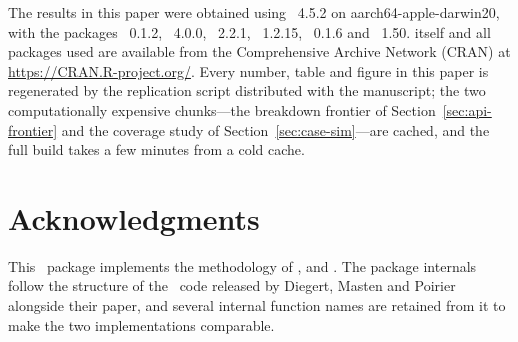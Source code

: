 \documentclass[article]{jss}\usepackage[]{graphicx}\usepackage[]{xcolor}
\newcommand{\Rlang}{\proglang{R}}
\newcommand{\Stata}{\proglang{Stata}}
\begin{document}
The results in this paper were obtained using
~4.5.2
on aarch64-apple-darwin20, with the packages
~0.1.2,
~4.0.0,
~2.2.1,
~1.2.15,
~0.1.6 and
~1.50.
 itself and all packages used are available from the
Comprehensive  Archive Network (CRAN) at
\url{https://CRAN.R-project.org/}. Every number, table and figure in this
paper is regenerated by the replication script  distributed
with the manuscript; the two computationally expensive
chunks---the breakdown frontier of Section~\ref{sec:api-frontier} and the
coverage study of Section~\ref{sec:case-sim}---are cached, and the full
build takes a few minutes from a cold cache.

\section*{Acknowledgments}

This \Rlang\ package implements the methodology of \citet{Diegert2026},
\citet{Oster2019} and \citet{Masten2026}. The package internals follow the
structure of the \Stata\ code released by Diegert, Masten and Poirier
alongside their paper, and several internal function names are retained
from it to make the two implementations comparable.


\end{document}
